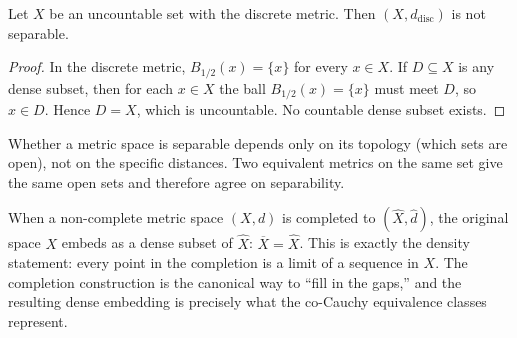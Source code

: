 \begin{proposition}
\label{prop:discrete-not-sep}
Let $X$ be an uncountable set with the discrete metric.
Then $(X, d_{\mathrm{disc}})$ is not separable.
\end{proposition}

\begin{proof}
In the discrete metric, $B_{1/2}(x) = \{x\}$ for every $x \in X$.
If $D \subseteq X$ is any dense subset, then for each $x \in X$
the ball $B_{1/2}(x) = \{x\}$ must meet $D$, so $x \in D$.
Hence $D = X$, which is uncountable.
No countable dense subset exists.
\end{proof}

\begin{remark*}
Whether a metric space is separable depends only on its topology
(which sets are open), not on the specific distances.
Two equivalent metrics on the same set give the same open sets and
therefore agree on separability.
\end{remark*}

\begin{remark*}
When a non-complete metric space $(X,d)$ is completed to $(\hat{X}, \hat{d})$,
the original space $X$ embeds as a dense subset of $\hat{X}$:
$\overline{X} = \hat{X}$.
This is exactly the density statement: every point in the completion
is a limit of a sequence in $X$.
The completion construction is the canonical way to ``fill in the gaps,''
and the resulting dense embedding is precisely what the co-Cauchy
equivalence classes represent.
\end{remark*}
